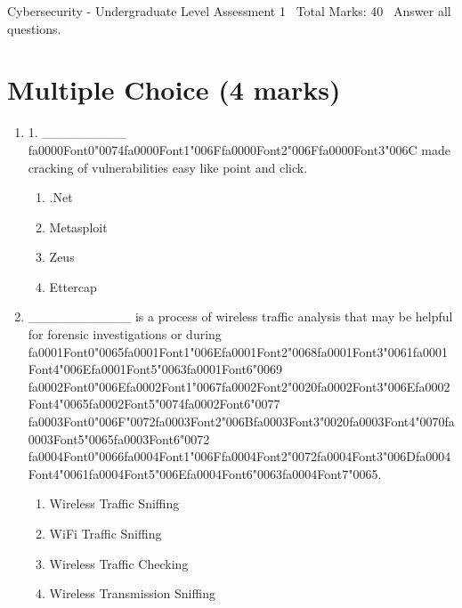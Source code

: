 \documentclass[12pt]{article}
\begin{document}
\begin{center}
Cybersecurity - Undergraduate Level Assessment 1 \
Total Marks: 40 \
Answer all questions.
\end{center}

\section*{Multiple Choice (4 marks)}
\begin{enumerate}[label=\arabic*.]
\item 1. \_\_\_\_\_\_\_\_\_ {\csname fa0000Font0\endcsname\char"0074}{\csname fa0000Font1\endcsname\char"006F}{\csname fa0000Font2\endcsname\char"006F}{\csname fa0000Font3\endcsname\char"006C} made cracking of vulnerabilities easy like point and click.
\begin{enumerate}[label=(\alph*)]
    \item .Net
    \item Metasploit
    \item Zeus
    \item Ettercap
\end{enumerate}
\item \_\_\_\_\_\_\_\_\_\_\_ is a process of wireless traffic analysis that may be helpful for forensic investigations or during {\csname fa0001Font0\endcsname\char"0065}{\csname fa0001Font1\endcsname\char"006E}{\csname fa0001Font2\endcsname\char"0068}{\csname fa0001Font3\endcsname\char"0061}{\csname fa0001Font4\endcsname\char"006E}{\csname fa0001Font5\endcsname\char"0063}{\csname fa0001Font6\endcsname\char"0069} {\csname fa0002Font0\endcsname\char"006E}{\csname fa0002Font1\endcsname\char"0067}{\csname fa0002Font2\endcsname\char"0020}{\csname fa0002Font3\endcsname\char"006E}{\csname fa0002Font4\endcsname\char"0065}{\csname fa0002Font5\endcsname\char"0074}{\csname fa0002Font6\endcsname\char"0077} {\csname fa0003Font0\endcsname\char"006F}{\char"0072}{\csname fa0003Font2\endcsname\char"006B}{\csname fa0003Font3\endcsname\char"0020}{\csname fa0003Font4\endcsname\char"0070}{\csname fa0003Font5\endcsname\char"0065}{\csname fa0003Font6\endcsname\char"0072} {\csname fa0004Font0\endcsname\char"0066}{\csname fa0004Font1\endcsname\char"006F}{\csname fa0004Font2\endcsname\char"0072}{\csname fa0004Font3\endcsname\char"006D}{\csname fa0004Font4\endcsname\char"0061}{\csname fa0004Font5\endcsname\char"006E}{\csname fa0004Font6\endcsname\char"0063}{\csname fa0004Font7\endcsname\char"0065}.
\begin{enumerate}[label=(\alph*)]
    \item Wireless Traffic Sniffing
    \item WiFi Traffic Sniffing
    \item Wireless Traffic Checking
    \item Wireless Transmission Sniffing
\end{enumerate}
\end{enumerate}
\end{document}
